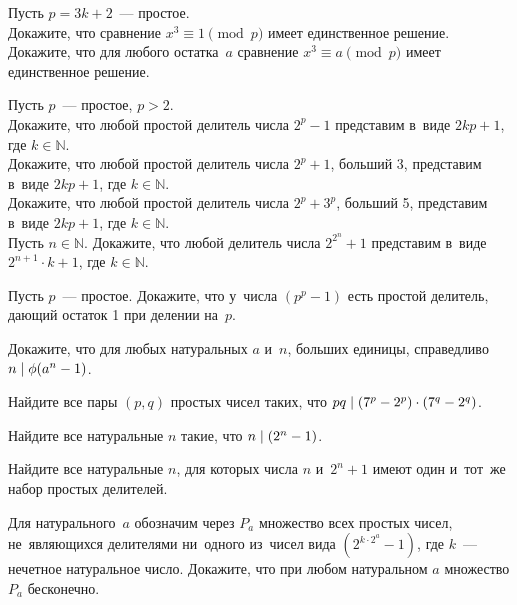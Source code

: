 \begin{problems}

\item
Пусть $p = 3 k + 2$~--- простое.
\\
\subproblem
Докажите, что сравнение $x^3 \equiv 1 \pmod{p}$ имеет единственное решение.
\\
\subproblem
Докажите, что для любого остатка~$a$ сравнение $x^3 \equiv a \pmod{p}$ имеет
единственное решение.

\item
Пусть $p$~--- простое, $p > 2$.
\\
\subproblem
Докажите, что любой простой делитель числа $2^p - 1$ представим
в~виде $2 k p + 1$, где $k \in \mathbb{N}$.
\\
\subproblem
Докажите, что любой простой делитель числа $2^p + 1$, больший 3, представим
в~виде $2 k p + 1$, где $k \in \mathbb{N}$.
\\
\subproblem
Докажите, что любой простой делитель числа $2^p + 3^p$, больший 5, представим
в~виде $2 k p + 1$, где $k \in \mathbb{N}$.
\\
\subproblem
Пусть $n \in \mathbb{N}$.
Докажите, что любой делитель числа $2^{2^n} + 1$ представим
в~виде $2^{n+1} \cdot k + 1$, где $k \in \mathbb{N}$.

\item
Пусть $p$~--- простое.
Докажите, что у~числа $(p^p - 1)$ есть простой делитель, дающий остаток 1 при
делении на~$p$.

\item
Докажите, что для любых натуральных $a$ и~$n$, больших единицы, справедливо
$n \mathrel{\vert} \mathrm{\phi}(a^n - 1)$.

\item
Найдите все пары $(p, q)$ простых чисел таких, что
$p q \mathrel{\vert} (7^{p} - 2^{p}) \cdot (7^{q} - 2^{q})$.

\item
Найдите все натуральные $n$ такие, что $n \mathrel{\vert} (2^n - 1)$.

\item
Найдите все натуральные $n$, для которых числа $n$ и~$2^n + 1$ имеют один
и~тот~же набор простых делителей. 	

\item
Для натурального~$a$ обозначим через $P_a$ множество всех простых чисел,
не~являющихся делителями ни~одного из~чисел вида $(2^{k \cdot 2^a} - 1)$, где
$k$~--- нечетное натуральное число.
Докажите, что при любом натуральном $a$ множество $P_a$ бесконечно.

\end{problems}

\endgroup %

